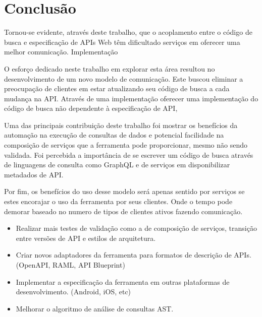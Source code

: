 \chapter{Conclusão}

Tornou-se evidente, através deste trabalho, que o acoplamento entre o código de busca e especificação de APIs Web têm dificultado serviços em oferecer uma melhor comunicação. Implementação

O esforço dedicado neste trabalho em explorar esta área resultou no desenvolvimento de um novo modelo de comunicação. Este buscou eliminar a preocupação de clientes em estar atualizando seu código de busca a cada mudança na API. Através de uma implementação oferecer uma implementação do código de busca não dependente à especificação de API,

Uma das principais contribuição deste trabalho foi mostrar os benefícios da automação na execução de consultas de dados e potencial facilidade na composição de serviços que a ferramenta pode proporcionar, mesmo não sendo validada. Foi percebida a importância de se escrever um código de busca através de linguagens de consulta como GraphQL e de serviços em disponibilizar metadados de API.

Por fim, os benefícios do uso desse modelo será apenas sentido por serviços se estes encorajar o uso da ferramenta por seus clientes. Onde o tempo pode demorar baseado no numero de tipos de clientes ativos fazendo comunicação.



\begin{itemize}
\item Realizar mais testes de validação como a de composição de serviços, transição entre versões de API e estilos de arquitetura.
\item Criar novos adaptadores da ferramenta para formatos de descrição de APIs. (OpenAPI, RAML, API Blueprint)
\item Implementar a especificação da ferramenta em outras plataformas de desenvolvimento. (Android, iOS, etc)
\item Melhorar o algoritmo de análise de consultas AST.
\end{itemize}
